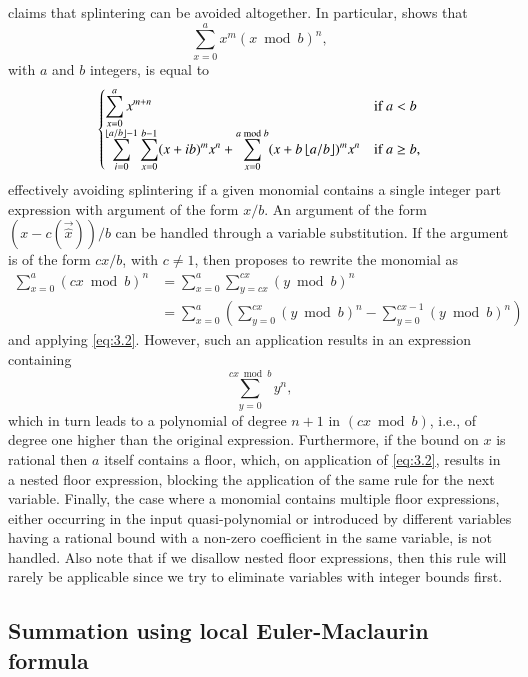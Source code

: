  claims that splintering
can be avoided altogether.
In particular, 
shows that
$$
\sum_{x=0}^a x^m\left(x \bmod b\right)^n
,
$$
with $a$ and $b$ integers, is equal to
\begin{equation}
\label{eq:3.2}
\begin{cases}
\displaystyle
\sum_{x=0}^a x^{m+n} & \text{if $a<b$}
\\
\displaystyle
\sum_{i=0}^{\floor{a/b}-1} \sum_{x=0}^{b-1} (x+ib)^m x^n +
\sum_{x=0}^{a \bmod b} (x+b\floor{a/b})^m x^n & \text{if $a\ge b$}
,
\end{cases}
\end{equation}
effectively avoiding splintering if a given monomial contains
a single integer part expression with argument of the form
$x/b$.  An argument of the form $(x-c(\vec{\hat x}))/b$ can
be handled through a variable substitution.
If the argument is of the form $c x/b$, with $c \ne 1$,
then  proposes to
rewrite the monomial as
\begin{align*}
\sum_{x=0}^a (c x \bmod b)^n
& =
        \sum_{x=0}^a \sum_{y=cx}^{cx} (y \bmod b)^n
\\
& =
    \sum_{x=0}^a
    \left(\sum_{y=0}^{cx} (y \bmod b)^n - \sum_{y=0}^{cx-1} (y \bmod b)^n\right)
\end{align*}
and applying \eqref{eq:3.2}.
However, such an application results in an expression containing
$$
        \sum_{y=0}^{cx \bmod b} y^n
,
$$
which in turn leads to a polynomial of degree $n+1$ in $(c x \bmod b)$,
i.e., of degree one higher than the original expression.
Furthermore, if the bound on $x$ is rational then $a$ itself contains
a floor, which, on application of \eqref{eq:3.2}, results in
a nested floor expression, blocking the application of the same
rule for the next variable.
Finally, the case where a monomial contains multiple floor
expressions, either occurring in the input quasi-polynomial
or introduced by different variables having a rational
bound with a non-zero coefficient in the same variable, is not handled.
Also note that if we disallow nested floor expressions,
then this rule will rarely be applicable since we try to eliminate
variables with integer bounds first.

\subsection{Summation using local Euler-Maclaurin formula}
\label{s:euler}


